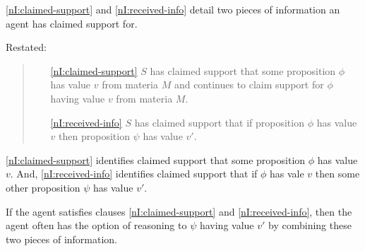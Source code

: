 \begin{note}
  \ref{nI:claimed-support} and \ref{nI:received-info} detail two pieces of information an agent has claimed support for.

  Restated:
  \begin{quote}
    \color{blue}
        \begin{enumerate}
    \item[\ref{nI:claimed-support}] \(S\) has claimed support that some proposition \(\phi\) has value \(v\) from materia \(M\) and continues to claim support for \(\phi\) having value \(v\) from materia \(M\).
    \item[\ref{nI:received-info}] \(S\) has claimed support that if proposition \(\phi\) has value \(v\) then proposition \(\psi\) has value \(v'\).
    \end{enumerate}
  \end{quote}

  \ref{nI:claimed-support} identifies claimed support that some proposition \(\phi\) has value \(v\).
  And, \ref{nI:received-info} identifies claimed support that if \(\phi\) has vale \(v\) then some other proposition \(\psi\) has value \(v'\).

  If the agent satisfies clauses \ref{nI:claimed-support} and \ref{nI:received-info}, then the agent often has the option of reasoning to \(\psi\) having value \(v'\) by combining these two pieces of information.
\end{note}

